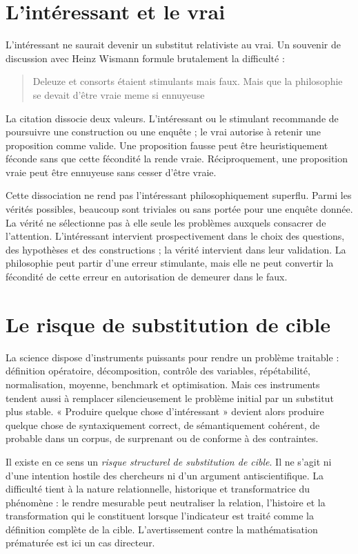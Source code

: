 \documentclass[11pt,a4paper]{article}
\begin{document}
\section{L'intéressant et le vrai}

L'intéressant ne saurait devenir un substitut relativiste au vrai. Un souvenir
de discussion avec Heinz Wismann formule brutalement la difficulté :

\begin{quote}
Deleuze et consorts étaient stimulants mais faux. Mais que la philosophie se
devait d'être vraie meme si ennuyeuse
\end{quote}

La citation dissocie deux valeurs. L'intéressant ou le stimulant recommande de
poursuivre une construction ou une enquête ; le vrai autorise à retenir une
proposition comme valide. Une proposition fausse peut être heuristiquement
féconde sans que cette fécondité la rende vraie. Réciproquement, une proposition
vraie peut être ennuyeuse sans cesser d'être vraie.

Cette dissociation ne rend pas l'intéressant philosophiquement superflu. Parmi
les vérités possibles, beaucoup sont triviales ou sans portée pour une enquête
donnée. La vérité ne sélectionne pas à elle seule les problèmes auxquels
consacrer de l'attention. L'intéressant intervient prospectivement dans le choix
des questions, des hypothèses et des constructions ; la vérité intervient dans
leur validation. La philosophie peut partir d'une erreur stimulante, mais elle
ne peut convertir la fécondité de cette erreur en autorisation de demeurer dans
le faux.

\section{Le risque de substitution de cible}

La science dispose d'instruments puissants pour rendre un problème traitable :
définition opératoire, décomposition, contrôle des variables, répétabilité,
normalisation, moyenne, benchmark et optimisation. Mais ces instruments tendent
aussi à remplacer silencieusement le problème initial par un substitut plus
stable. « Produire quelque chose d'intéressant » devient alors produire quelque
chose de syntaxiquement correct, de sémantiquement cohérent, de probable dans un
corpus, de surprenant ou de conforme à des contraintes.

Il existe en ce sens un \emph{risque structurel de substitution de cible}. Il ne
s'agit ni d'une intention hostile des chercheurs ni d'un argument
antiscientifique. La difficulté tient à la nature relationnelle, historique et
transformatrice du phénomène : le rendre mesurable peut neutraliser la relation,
l'histoire et la transformation qui le constituent lorsque l'indicateur est
traité comme la définition complète de la cible. L'avertissement contre la
mathématisation prématurée
\parencite{russell1995rationality,russell1995awardlecture} est ici un cas
directeur.
\end{document}
